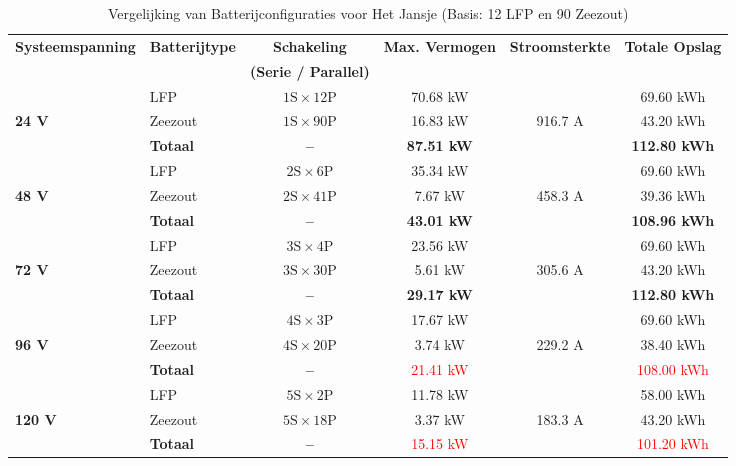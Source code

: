 \begin{table}[h!]
\centering
\caption{Vergelijking van Batterijconfiguraties voor Het Jansje (Basis: 12 LFP en 90 Zeezout)}
\label{tab:batterij_vergelijking_compleet}
\begin{tabular}{|l||l|c|c|c|c|}
\hline
\textbf{Systeemspanning} & \textbf{Batterijtype} & \textbf{Schakeling} & \textbf{Max. Vermogen} & \textbf{Stroomsterkte} & \textbf{Totale Opslag} \\ 
 & & \textbf{(Serie / Parallel)} &  & & \\ \hline\hline

 & LFP  & $1\text{S} \times 12\text{P}$ & 70.68 kW & & 69.60 kWh \\ \cline{2-4} \cline{6-6}
\textbf{24 V} & Zeezout & $1\text{S} \times 90\text{P}$ & 16.83 kW & 916.7 A & 43.20 kWh \\ \cline{2-4} \cline{6-6}
 & \textbf{Totaal} & \textbf{--} & \textbf{87.51 kW} & & \textbf{112.80 kWh} \\ \hline\hline

 & LFP  & $2\text{S} \times 6\text{P}$ & 35.34 kW & & 69.60 kWh \\ \cline{2-4} \cline{6-6}
\textbf{48 V} & Zeezout & $2\text{S} \times 41\text{P}$ & 7.67 kW & 458.3 A & 39.36 kWh \\ \cline{2-4} \cline{6-6}
 & \textbf{Totaal} & \textbf{--} & \textbf{43.01 kW} & & \textbf{108.96 kWh} \\ \hline\hline

 & LFP  & $3\text{S} \times 4\text{P}$ & 23.56 kW & & 69.60 kWh \\ \cline{2-4} \cline{6-6}
\textbf{72 V} & Zeezout & $3\text{S} \times 30\text{P}$ & 5.61 kW & 305.6 A & 43.20 kWh \\ \cline{2-4} \cline{6-6}
 & \textbf{Totaal} & \textbf{--} & \textbf{29.17 kW} & & \textbf{112.80 kWh} \\ \hline\hline

 & LFP & $4\text{S} \times 3\text{P}$ & 17.67 kW & & 69.60 kWh \\ \cline{2-4} \cline{6-6}
\textbf{96 V} & Zeezout & $4\text{S} \times 20\text{P}$ & 3.74 kW & 229.2 A & 38.40 kWh \\ \cline{2-4} \cline{6-6}
 & \textbf{Totaal} & \textbf{--} & \textcolor{red}{21.41 kW} & & \textcolor{red}{108.00 kWh} \\ \hline\hline

 & LFP & $5\text{S} \times 2\text{P}$ & 11.78 kW & & 58.00 kWh \\ \cline{2-4} \cline{6-6}
\textbf{120 V} & Zeezout & $5\text{S} \times 18\text{P}$ & 3.37 kW & 183.3 A & 43.20 kWh \\ \cline{2-4} \cline{6-6}
 & \textbf{Totaal} & \textbf{--} & \textcolor{red}{15.15 kW} & & \textcolor{red}{101.20 kWh} \\ \hline\hline
\end{tabular}
\end{table}

